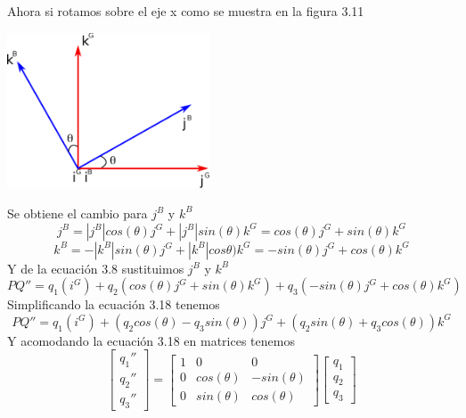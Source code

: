 Ahora si rotamos sobre el eje x como se muestra en la figura 3.11
\begin{center}
	\includegraphics[width=0.45\textwidth]{Contenido/Cuerpo/Capitulo3/Fig17.eps}
	\label{fig:ModeloMat:Fig1}
\end{center}
Se obtiene el cambio para $j^B$ y $k^B$
\begin{equation}
	j^B = |j^B|cos(\theta)j^G + |j^B|sin(\theta)k^G = cos(\theta)j^G + sin(\theta)k^G
\end{equation}
\begin{equation}
	k^B = -|k^B|sin(\theta)j^G + |k^B|cos\theta)k^G = -sin(\theta)j^G + cos(\theta)k^G
\end{equation}
Y de la ecuación 3.8 sustituimos $j^B$ y $k^B$
\begin{equation}
	PQ'' = q_1(i^G) + q_2(cos(\theta)j^G + sin(\theta)k^G) + q_3(-sin(\theta)j^G + cos(\theta)k^G)
\end{equation}
Simplificando la ecuación 3.18 tenemos
\begin{equation}
	PQ''= q_1(i^G) + (q_2cos(\theta) - q_3sin(\theta))j^G + (q_2sin(\theta) + q_3cos(\theta))k^G
\end{equation}
Y acomodando la ecuación 3.18 en matrices tenemos
\begin{equation}
	\begin{bmatrix}
		q_1'' \\
		q_2'' \\
		q_3''
	\end{bmatrix}
	=
	\begin{bmatrix}
		1 & 0           & 0            \\
		0 & cos(\theta) & -sin(\theta) \\
		0 & sin(\theta) & cos(\theta)
	\end{bmatrix}
	\begin{bmatrix}
		q_1 \\
		q_2 \\
		q_3
	\end{bmatrix}
\end{equation}



